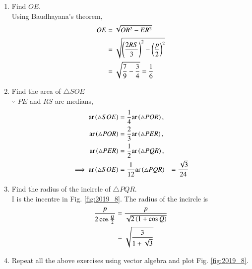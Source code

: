 \documentclass[journal,12pt,twocolumn]{IEEEtran}
\renewcommand\thesection{\arabic{section}}
\begin{document}
\begin{enumerate}[label=\thesection.\arabic*
,ref=\thesection.\theenumi]
\begin{align}
RS &= \sqrt{q^2+\brak{\frac{r}{2}}^2-qr\cos P}
\\
&= \sqrt{1+\frac{1}{4}+\frac{1}{2}} = \sqrt{\frac{7}{2}}
\end{align}
\item Find $OE$.
\\
\solution 
Using Baudhayana's theorem,
\begin{align}
OE  &= \sqrt{OR^2 - ER^2}
\\
&= \sqrt{\left(\frac{2RS}{3}\right)^2 - \left(\frac{p}{2}\right)^2} 
\\
&= \sqrt{\frac{7}{9}-\frac{3}{4}} = \frac{1 }{6}
\end{align}
%
\item Find the area of $\triangle SOE$
\\
\solution
$\because$ $PE$ and $RS$ are medians, 
\begin{align}
\text{ar}\left(\triangle SOE \right)&= \frac{1}{4}\text{ar}\left(\triangle POR\right),
\\
\text{ar}\left(\triangle POR \right)&=  \frac{2}{3}\text{ar}\left(\triangle PER\right),
\\
\text{ar}\left(\triangle PER \right)&=  \frac{1}{2}\text{ar}\left(\triangle PQR\right),
\\
\implies \text{ar}\left(\triangle SOE\right) &= \frac{1}{12}\text{ar}\left(\triangle PQR\right)
&= \frac{\sqrt{3}}{24}
\end{align}

\item Find the radius of the incircle of $\triangle PQR $.
%
\\
\solution
I is the incentre in Fig. \ref{fig:2019_8}.  The radius of the incircle is 
\begin{align}
\frac{p}{2\cos\frac{Q}{2}} &= \frac{p}{\sqrt{2\left(1+\cos Q\right)}}
\\ &= \sqrt{\frac{3}{1+\sqrt{3}}}
\end{align}
%
\item Repeat all the above exercises using vector algebra and plot Fig. \ref{fig:2019_8}.
\end{enumerate}
%
\end{document}
